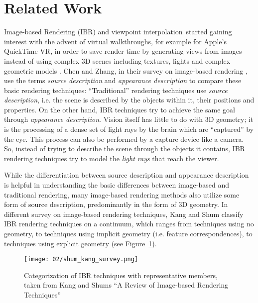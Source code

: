 \section{Related Work}\label{sec:related_work}
Image-based Rendering (IBR) and viewpoint interpolation\footnotemark\ started gaining interest with the advent of virtual walkthroughs, for example for Apple's QuickTime\textsuperscript{\textregistered} VR, in order to save render time by generating views from images instead of using complex 3D scenes including textures, lights and complex geometric models \cite{quicktime}.
Chen and Zhang, in their survey on image-based rendering \cite{survey2004}, use the terms \emph{source description} and \emph{appearance description} to compare these basic rendering techniques: ``Traditional'' rendering techniques use \emph{source description}, i.e. the scene is described by the objects within it, their positions and properties. On the other hand, IBR techniques try to achieve the same goal through \emph{appearance description}. Vision itself has little to do with 3D geometry; it is the processing of a dense set of light rays by the brain which are ``captured'' by the eye. This process can also be performed by a capture device like a camera. So, instead of trying to describe the scene through the objects it contains, IBR rendering techniques try to model the \emph{light rays} that reach the viewer. 


While the differentiation between source description and appearance description is helpful in understanding the basic differences between image-based and traditional rendering, many image-based rendering methods also utilize some form of source description, predominantly in the form of 3D geometry. In different survey on image-based rendering techniques, Kang and Shum \cite{survey2000} classify IBR rendering techniques on a continuum, which ranges from techniques using no geometry, to techniques using implicit geometry (i.e. feature correspondences), to techniques using explicit geometry (see Figure~\ref{fig:survey_categorization}).

\begin{figure}
		\centering
		\texttt{[image: 02/shum\_kang\_survey.png]}
    \caption[Categorization of IBR techniques from \cite{survey2000}]{Categorization of IBR techniques with representative members, taken from Kang and Shums ``A Review of Image-based Rendering Techniques''\cite{survey2000}}
		\label{fig:survey_categorization}
\end{figure}

